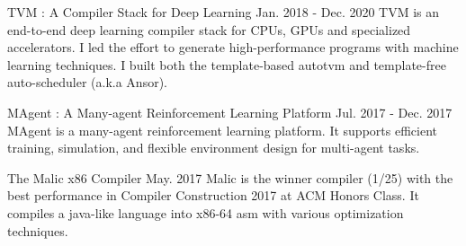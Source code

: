 

\begin{cventries}

  \cventry
    {} %
	{TVM : A Compiler Stack for Deep Learning } %
	{Jan. 2018 - Dec. 2020} %
	{} %
	{
		TVM is an end-to-end deep learning compiler stack for CPUs, GPUs and specialized accelerators. I led the effort to generate high-performance programs with machine learning techniques. I built both the template-based autotvm and template-free auto-scheduler (a.k.a Ansor).
	}

  \cventry
	{} %
	{MAgent : A Many-agent Reinforcement Learning Platform } %
	{Jul. 2017 - Dec. 2017} %
	{} %
	{
		MAgent is a many-agent reinforcement learning platform. It supports efficient training, simulation, and flexible environment design for multi-agent tasks.
	}	


  \cventry
    {} %
    {The Malic x86 Compiler
    	 	} %
    {May. 2017} %
    {} %
    {
      Malic is the winner compiler (1/25) with the best performance in Compiler Construction 2017 at ACM Honors Class. It compiles a java-like language into x86-64 asm with various optimization techniques.
    }

\end{cventries}

